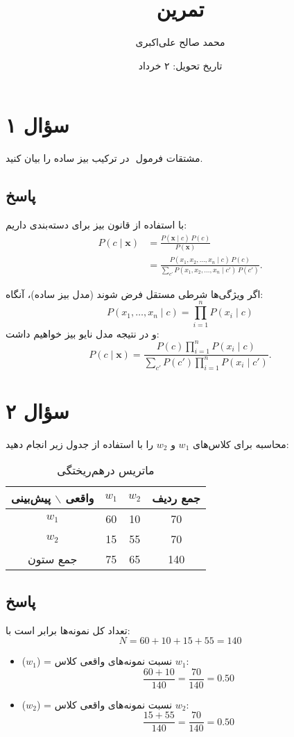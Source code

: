 \documentclass[12pt]{article}
\title{تمرین \lr{Confusion Matrix}}
\author{محمد صالح علی‌اکبری}
\date{تاریخ تحویل: ۲ خرداد}
\begin{document}
	
	\maketitle
	
	\section*{سؤال ۱}
	‫مشتقات‬ ‫فرمول‬ ‬ ‫در‬ ‫ترکیب‬ ‫بیز‬ ‫ساده‬ ‫را‬ ‫بیان‬ ‫کنید‬.
	
	\subsection*{پاسخ}
	
	با استفاده از قانون بیز برای دسته‌بندی داریم:
	\begin{align*}
		P(c\mid \mathbf{x}) &= \frac{P(\mathbf{x}\mid c)\,P(c)}{P(\mathbf{x})} \\
		&= \frac{P(x_1, x_2, \dots, x_n\mid c)\,P(c)}{\sum_{c'}P(x_1, x_2, \dots, x_n\mid c')\,P(c')}.
	\end{align*}
	
	اگر ویژگی‌ها شرطی مستقل فرض شوند (مدل بیز ساده)، آنگاه:
	\[
	P(x_1, \dots, x_n\mid c) = \prod_{i=1}^n P(x_i\mid c)
	\]
	و در نتیجه مدل نایو بیز خواهیم داشت:
	\[
	P(c\mid \mathbf{x}) = \frac{P(c)\prod_{i=1}^n P(x_i\mid c)}{\sum_{c'}P(c')\prod_{i=1}^n P(x_i\mid c')}.
	\]
	
	\section*{سؤال ۲}
	محاسبه  برای کلاس‌های $w_1$ و $w_2$ را با استفاده از جدول زیر انجام دهید:
	
	\begin{table}[h!]
		\centering
		\caption{ماتریس درهم‌ریختگی}
		\begin{tabular}{c|cc|c}
			واقعی $\backslash$ پیش‌بینی & $w_1$ & $w_2$ & جمع ردیف \\
			\hline
			$w_1$ & 60 & 10 & 70 \\
			$w_2$ & 15 & 55 & 70 \\
			\hline
			جمع ستون & 75 & 65 & 140 \\
		\end{tabular}
	\end{table}
	
	\subsection*{پاسخ}
	
	تعداد کل نمونه‌ها برابر است با:
	\[
	N = 60 + 10 + 15 + 55 = 140
	\]
	
	\begin{itemize}
		\item {}($w_1$) = نسبت نمونه‌های واقعی کلاس $w_1$: \[ \frac{60 + 10}{140} = \frac{70}{140} = 0.50 \]
		\item {}($w_2$) = نسبت نمونه‌های واقعی کلاس $w_2$: \[ \frac{15 + 55}{140} = \frac{70}{140} = 0.50 \]
	\end{itemize}
	
\end{document}
